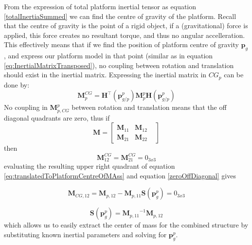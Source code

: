 From the expression of total platform inertial tensor as equation \ref{totalInertiaSummed} we can find the centre of gravity of the platform. Recall that the centre of gravity is the point of a rigid object, if a (gravitational) force is applied, this force creates no resultant torque, and thus no angular accelleration. 
This effectively means that if we find the position of platform centre of gravity $\textbf{p}_{g}$, and express our platform model in that point (similar as in equation \ref{eq:InertialMatrixTransposed}), no coupling between rotation and translation should exist in the inertial matrix. Expressing the inertial matrix in $CG_{p}$ can be done by:
\begin{equation}
\textbf{M}_{p}^{CG} =  \textbf{H}^{\top}(\textbf{p}_{g/p}^{p})  \textbf{M}_{p}^{p} \textbf{H}(\textbf{p}_{g/p}^{p})
\label{eq:translatedToPlatformCentreOfMAss}
\end{equation}
No coupling in $\textbf{M}_{p,CG}^{p}$ between rotation and translation means that the off diagonal quadrants are zero, thus if
\begin{equation}
\textbf{M} =  \begin{bmatrix}
\textbf{M}_{11} & \textbf{M}_{12} \\ \textbf{M}_{21} & \textbf{M}_{22} &
\end{bmatrix}
\end{equation}
then 
\begin{equation}
 \textbf{M}_{12}^{CG} = \textbf{M}_{21}^{CG} = 0_{3x3}
 \label{zeroOffDiagonal}
\end{equation}
evaluating the resulting upper right quadrant of equation \ref{eq:translatedToPlatformCentreOfMAss} and equation \ref{zeroOffDiagonal} gives

\begin{equation}
 \textbf{M}_{CG,12} = \textbf{M}_{p,12} - \textbf{M}_{p,11} \textbf{S}(\textbf{p}_{g}^{p}) = 0_{3x3} 
\end{equation}

\begin{equation}
 \textbf{S}(\textbf{p}_{g}^{p})  = {\textbf{M}_{p,11}}^{-1} \textbf{M}_{p,12} 
\end{equation}
which allows us to easily extract the center of mass for the combined structure by substituting known inertial parameters and solving for $\textbf{p}_{g}^{p}$.

